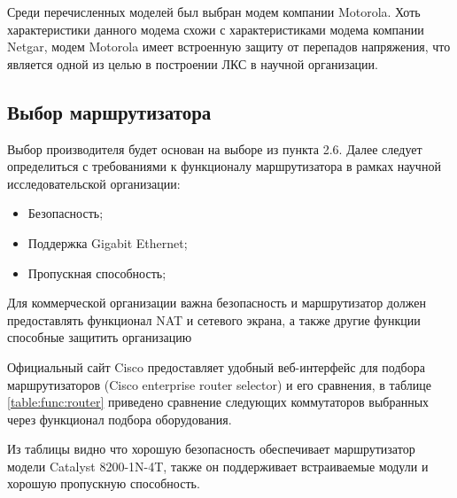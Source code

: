Среди перечисленных моделей был выбран модем компании Motorola. Хоть характеристики данного модема схожи с характеристиками модема компании Netgar,
модем Motorola имеет встроенную защиту от перепадов напряжения, что является одной из целью в построении ЛКС в научной организации.

\subsection{Выбор маршрутизатора}

Выбор производителя будет основан на выборе из пункта 2.6. 
Далее следует определиться с требованиями к функционалу маршрутизатора 
в рамках научной исследовательской организации:

\begin{itemize}
    \item Безопасность;
    \item Поддержка Gigabit Ethernet;
    \item Пропускная способность;
\end{itemize}

Для коммерческой организации важна безопасность и маршрутизатор должен предоставлять функционал NAT и сетевого экрана, а также другие функции способные защитить организацию

Официальный сайт Cisco предоставляет удобный веб-интерфейс для подбора маршрутизаторов (Cisco enterprise router selector) и его сравнения, в таблице \ref{table:func:router} приведено сравнение следующих коммутаторов 
выбранных через функционал подбора оборудования.

Из таблицы видно что хорошую безопасность обеспечивает маршрутизатор модели Catalyst 8200-1N-4T, также он поддерживает встраиваемые модули и хорошую пропускную способность.

